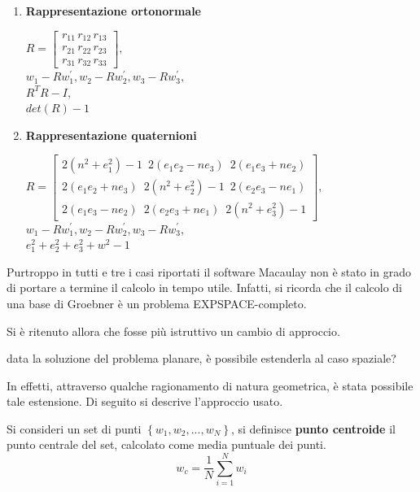 \begin{enumerate}
	\item \textbf{Rappresentazione ortonormale}
	 \begin{center}
	 	$R = 
	 	\begin{bmatrix}
	 		r_{11} \, r_{12} \, r_{13} \\
	 		r_{21} \, r_{22} \, r_{23} \\
	 		r_{31} \, r_{32} \, r_{33} 	 	
	 	\end{bmatrix},$\\ \vspace{10pt}
	 	$w_1 - Rw_1^{'}, w_2 - Rw_2^{'}, w_3 - Rw_3^{'},$ \\
	 	$R^{T}R - I,$ \\
	 	$det(R) - 1$	 	
	 \end{center}
	\item \textbf{Rappresentazione quaternioni}  
	\begin{center}
		\nonumber $R = 
		\begin{bmatrix}
			2(n^2+e_1^2) - 1 \,\,\, 2(e_1e_2 - ne_3) \,\,\, 2(e_1e_3 + ne_2) \\
			2(e_1e_2+ne_3) \,\,\, 2(n^2+e_2^2) - 1 \,\,\, 2(e_2e_3 - ne_1) \\
			2(e_1e_3-ne_2) \,\,\, 2(e_2e_3+ne_1) \,\,\, 2(n^2+e_3^2) - 1	 	
		\end{bmatrix},$\\ \vspace{10pt}
		$w_1 -  Rw_1^{'}, w_2 - Rw_2^{'}, w_3 - Rw_3^{'},$ \\
		$e_1^2 + e_2^2 + e_3^2 + w^2 - 1 $
	\end{center}
\end{enumerate}

Purtroppo in tutti e tre i casi riportati il software Macaulay non è stato in grado di portare a termine il calcolo in tempo utile. Infatti, si ricorda che il calcolo di una base di Groebner è un problema EXPSPACE-completo. 

Si è ritenuto allora che fosse più istruttivo un cambio di approccio.
\begin{pro}
	data la soluzione del problema planare, è possibile estenderla al caso spaziale?
\end{pro}

In effetti, attraverso qualche ragionamento di natura geometrica, è stata possibile tale estensione. Di seguito si descrive l'approccio usato.

\begin{defn}
	Si consideri un set di punti $\left\lbrace w_1, w_2, ..., w_N \right\rbrace$, si definisce \textbf{punto centroide} il punto centrale del set, calcolato come media puntuale dei punti.
	\begin{equation}
		w_c = \frac{1}{N}\sum_{i = 1}^{N} w_i
	\end{equation}
\end{defn}

